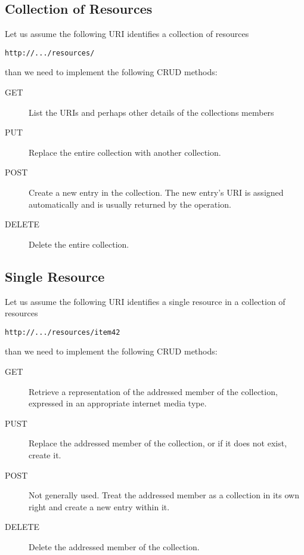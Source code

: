 \subsection{Collection of Resources}

Let us assume the following URI identifies a collection of resources

\verb|http://.../resources/|

than we need to implement the following CRUD methods:

\begin{description} 
    \item[GET] List the URIs and perhaps other details of the
      collections members
    \item[PUT] Replace the entire collection with another collection.
    \item[POST] Create a new entry in the collection. The new entry’s
      URI is assigned automatically and is usually returned by the
      operation.
    \item[DELETE] Delete the entire collection.
\end{description} 


\subsection{Single Resource}

Let us assume the following URI identifies a single resource in a
collection of resources

\verb|http://.../resources/item42|

than we need to implement the following CRUD methods:

    \begin{description} 

    \item[GET] Retrieve a representation of the addressed member of
      the collection, expressed in an appropriate internet media type.

    \item[PUST] Replace the addressed member of the collection, or if
      it does not exist, create it.

    \item[POST] Not generally used. Treat the addressed member as a
      collection in its own right and create a new entry within it.
                               
    \item[DELETE] Delete the addressed member of the collection. 
\end{description} 

